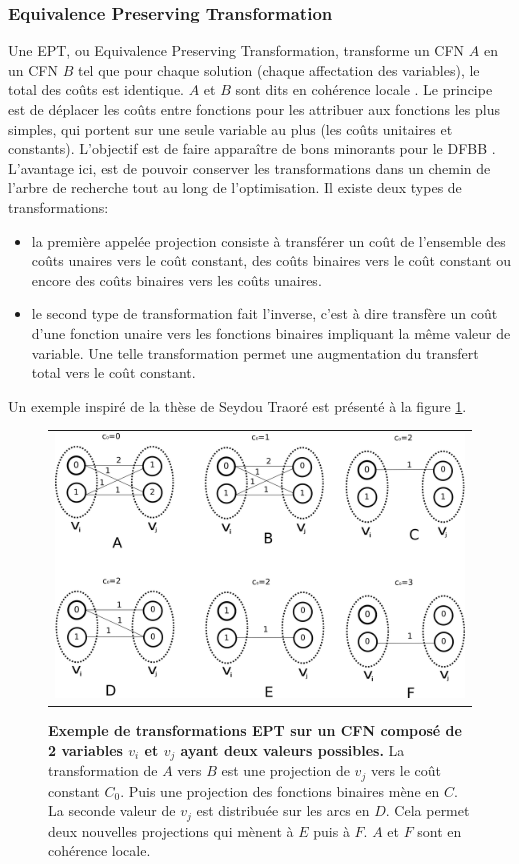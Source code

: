 \subsubsection{Equivalence Preserving Transformation}
Une EPT, ou \og Equivalence Preserving Transformation\fg, transforme un CFN $A$ en un CFN $B$ tel que pour chaque solution (chaque affectation des variables), le total des coûts  est identique. $A$ et $B$ sont dits \og en cohérence locale \fg. Le principe est de déplacer les coûts entre fonctions pour les attribuer aux fonctions les plus simples, qui portent sur une seule variable au plus (les coûts unitaires et constants). L'objectif est de faire apparaître de bons minorants pour le DFBB \cite{schiex00}. L'avantage ici, est de pouvoir conserver les transformations dans un chemin de l'arbre de recherche tout au long de l'optimisation. Il existe deux types de transformations:
\begin{itemize}
\item la première appelée projection consiste à transférer un coût de l'ensemble des coûts unaires vers le coût constant, des coûts binaires vers le coût constant ou encore des coûts binaires vers les coûts unaires.
\item le second type de transformation fait l'inverse, c'est à dire transfère un coût d'une fonction unaire vers les fonctions binaires impliquant la même valeur de variable. Une telle transformation permet une augmentation du transfert total vers le coût constant.
\end{itemize}
Un exemple inspiré de la thèse de Seydou Traoré est présenté à  la figure \ref{fig:EPT}.

\begin{figure}[!htbp]
  \centering
  \begin{tabular}{c}
    \includegraphics[width=14cm]{figure/coherence_local.png} \\
  \end{tabular}
  \caption{\textbf{Exemple de transformations EPT sur un CFN composé de 2 variables $v_i$ et $v_j$ ayant deux valeurs possibles.} La transformation de $A$ vers $B$ est une projection de $v_j$ vers le coût constant $C_0$. Puis une projection des fonctions binaires mène en $C$. La seconde valeur de $v_j$ est distribuée sur les arcs en $D$. Cela permet deux nouvelles projections qui mènent à $E$ puis à $F$. $A$ et $F$ sont en cohérence locale.}
  \label{fig:EPT}
\end{figure}

